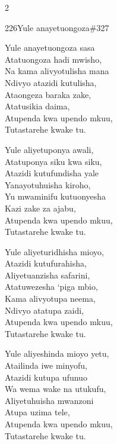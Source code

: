 \begin{multicols}{2}
\begin{hymn}{226}{Yule anayetuongoza}{\#327}
\begin{stanza}
Yule anayetuongoza sasa\\
Atatuongoza hadi mwisho,\\
Na kama alivyotulisha mana\\
Ndivyo atazidi kutulisha,\\
Ataongeza baraka zake,\\
Atatusikia daima,\\
Atupenda kwa upendo mkuu,\\
Tutastarehe kwake tu.
\end{stanza}
\begin{stanza}
Yule aliyetuponya awali,\\
Atatuponya siku kwa siku,\\
Atazidi kutufundisha yale\\
Yanayotuhuisha kiroho,\\
Yu mwaminifu kutuonyesha\\
Kazi zake za ajabu,\\
Atupenda kwa upendo mkuu,\\
Tutastarehe kwake tu.
\end{stanza}
\begin{stanza}
Yule aliyeturidhisha mioyo,\\
Atazidi kutufurahisha,\\
Aliyetuanzisha safarini,\\
Atatuwezesha `piga mbio,\\
Kama alivyotupa neema,\\
Ndivyo atatupa zaidi,\\
Atupenda kwa upendo mkuu,\\
Tutastarehe kwake tu.
\end{stanza}
\begin{stanza}
Yule aliyeshinda mioyo yetu,\\
Atailinda iwe minyofu,\\
Atazidi kutupa ufunuo\\
Wa wema wake na utukufu,\\
Aliyetuhuisha mwanzoni\\
Atupa uzima tele,\\
Atupenda kwa upendo mkuu,\\
Tutastarehe kwake tu.
\end{stanza}
\end{hymn}


\end{multicols}
